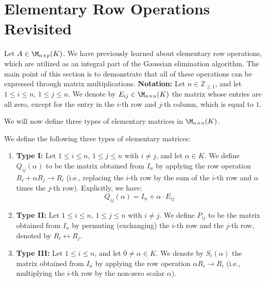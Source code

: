 \section{Elementary Row Operations Revisited}

Let $A \in \M_{n \times p}(K)$. We have previously learned about elementary row operations, which are utilized as an integral part of the Gaussian elimination algorithm. The main point of this section is to demonstrate that all of these operations can be expressed through matrix multiplications.
\textbf{Notation:} Let $n \in \mathbb{Z}_{\ge 1}$, and let $1 \le i \le n$, $1 \le j \le n$. We denote by $E_{ij} \in \M_{n \times n}(K)$ the matrix whose entries are all zero, except for the entry in the $i$-th row and $j$-th column, which is equal to $1$. 

We will now define three types of elementary matrices in $\M_{n \times n}(K)$.

\begin{definition}
\label{def:elementary_matrices}
We define the following three types of elementary matrices:
\begin{enumerate}
    \item \textbf{Type I:} Let $1 \le i \le n$, $1 \le j \le n$ with $i \neq j$, and let $\alpha \in K$. We define $Q_{ij}(\alpha)$ to be the matrix obtained from $I_n$ by applying the row operation $R_i + \alpha R_j \longrightarrow R_i$ (i.e., replacing the $i$-th row by the sum of the $i$-th row and $\alpha$ times the $j$-th row). Explicitly, we have:
    \begin{equation*}
        Q_{ij}(\alpha) = I_n + \alpha \cdot E_{ij}
    \end{equation*}
    
    \item \textbf{Type II:} Let $1 \le i \le n$, $1 \le j \le n$ with $i \neq j$. We define $P_{ij}$ to be the matrix obtained from $I_n$ by permuting (exchanging) the $i$-th row and the $j$-th row, denoted by $R_i \leftrightarrow R_j$.
    
    \item \textbf{Type III:} Let $1 \le i \le n$, and let $0 \neq \alpha \in K$. We denote by $S_i(\alpha)$ the matrix obtained from $I_n$ by applying the row operation $\alpha R_i \longrightarrow R_i$ (i.e., multiplying the $i$-th row by the non-zero scalar $\alpha$).
\end{enumerate}
\end{definition}

